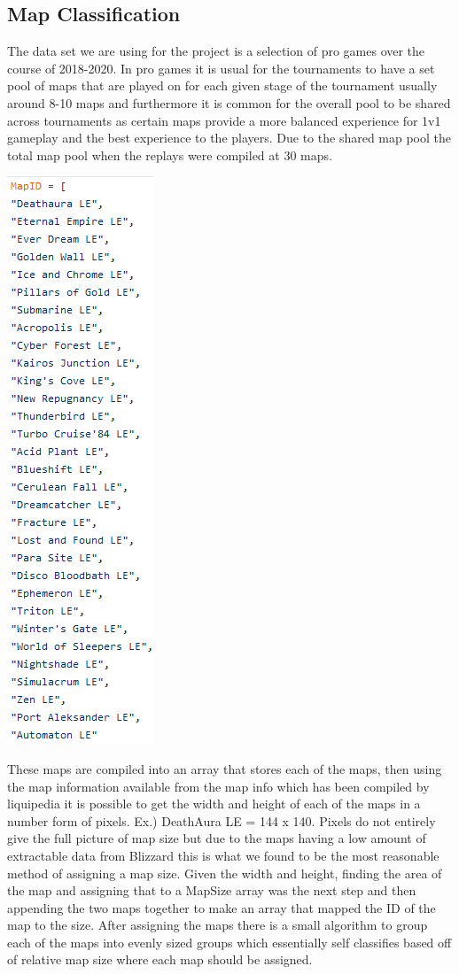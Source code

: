 \documentclass[a4paper,12pt]{report}
\begin{document}
\subsection{Map Classification}

The data set we are using for the project is a selection of pro games over the course of 2018-2020. In pro games it is usual for the tournaments to have a set pool of maps that are played on for each given stage of the tournament usually around 8-10 maps and furthermore it is common for the overall pool to be shared across tournaments as certain maps provide a more balanced experience for 1v1 gameplay and the best experience to the players. Due to the shared map pool the total map pool when the replays were compiled at 30 maps.

\begin{center}
    \captionsetup{type=figure}
    \includegraphics[width=.2\linewidth]{media/MapList.png}
\end{center}

These maps are compiled into an array that stores each of the maps, then using the map information available from the map info which has been compiled by liquipedia it is possible to get the width and height of each of the maps in a number form of pixels. Ex.) DeathAura LE = 144 x 140. Pixels do not entirely give the full picture of map size but due to the maps having a low amount of extractable data from Blizzard this is what we found to be the most reasonable method of assigning a map size. Given the width and height, finding the area of the map and assigning that to a MapSize array was the next step and then appending the two maps together to make an array that mapped the ID of the map to the size. After assigning the maps there is a small algorithm to group each of the maps into evenly sized groups which essentially self classifies based off of relative map size where each map should be assigned.
\end{document}
